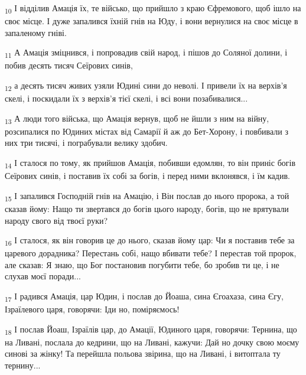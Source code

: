 \begin{tcolorbox}
\textsubscript{10} І відділив Амація їх, те військо, що прийшло з краю Єфремового, щоб ішло на своє місце. І дуже запалився їхній гнів на Юду, і вони вернулися на своє місце в запаленому гніві.
\end{tcolorbox}
\begin{tcolorbox}
\textsubscript{11} А Амація зміцнився, і попровадив свій народ, і пішов до Соляної долини, і побив десять тисяч Сеїрових синів,
\end{tcolorbox}
\begin{tcolorbox}
\textsubscript{12} а десять тисяч живих узяли Юдині сини до неволі. І привели їх на верхів'я скелі, і поскидали їх з верхів'я тієї скелі, і всі вони позабивалися...
\end{tcolorbox}
\begin{tcolorbox}
\textsubscript{13} А люди того війська, що Амація вернув, щоб не йшли з ним на війну, розсипалися по Юдиних містах від Самарії й аж до Бет-Хорону, і повбивали з них три тисячі, і пограбували велику здобич.
\end{tcolorbox}
\begin{tcolorbox}
\textsubscript{14} І сталося по тому, як прийшов Амація, побивши едомлян, то він приніс богів Сеїрових синів, і поставив їх собі за богів, і перед ними вклонявся, і їм кадив.
\end{tcolorbox}
\begin{tcolorbox}
\textsubscript{15} І запалився Господній гнів на Амацію, і Він послав до нього пророка, а той сказав йому: Нащо ти звертався до богів цього народу, богів, що не врятували народу свого від твоєї руки?
\end{tcolorbox}
\begin{tcolorbox}
\textsubscript{16} І сталося, як він говорив це до нього, сказав йому цар: Чи я поставив тебе за царевого дорадника? Перестань собі, нащо вбивати тебе? І перестав той пророк, але сказав: Я знаю, що Бог постановив погубити тебе, бо зробив ти це, і не слухав моєї поради...
\end{tcolorbox}
\begin{tcolorbox}
\textsubscript{17} І радився Амація, цар Юдин, і послав до Йоаша, сина Єгоахаза, сина Єгу, Ізраїлевого царя, говорячи: Іди но, поміряємось!
\end{tcolorbox}
\begin{tcolorbox}
\textsubscript{18} І послав Йоаш, Ізраїлів цар, до Амації, Юдиного царя, говорячи: Тернина, що на Ливані, послала до кедрини, що на Ливані, кажучи: Дай но дочку свою моєму синові за жінку! Та перейшла польова звірина, що на Ливані, і витоптала ту тернину...
\end{tcolorbox}

